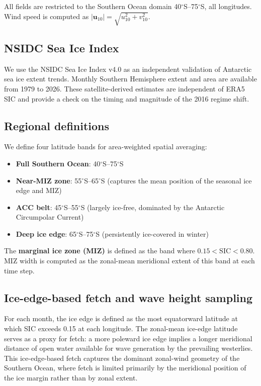 \documentclass[11pt]{article}
\begin{document}
All fields are restricted to the Southern Ocean domain 40$^\circ$S--75$^\circ$S, all longitudes. Wind speed is computed as $|\mathbf{u}_{10}| = \sqrt{u_{10}^2 + v_{10}^2}$.

\subsection{NSIDC Sea Ice Index}

We use the NSIDC Sea Ice Index v4.0\cite{Fetterer2017} as an independent validation of Antarctic sea ice extent trends. Monthly Southern Hemisphere extent and area are available from 1979 to 2026. These satellite-derived estimates are independent of ERA5 SIC and provide a check on the timing and magnitude of the 2016 regime shift.

\subsection{Regional definitions}

We define four latitude bands for area-weighted spatial averaging:
\begin{itemize}
\item \textbf{Full Southern Ocean}: 40$^\circ$S--75$^\circ$S
\item \textbf{Near-MIZ zone}: 55$^\circ$S--65$^\circ$S (captures the mean position of the seasonal ice edge and MIZ)
\item \textbf{ACC belt}: 45$^\circ$S--55$^\circ$S (largely ice-free, dominated by the Antarctic Circumpolar Current)
\item \textbf{Deep ice edge}: 65$^\circ$S--75$^\circ$S (persistently ice-covered in winter)
\end{itemize}

The \textbf{marginal ice zone (MIZ)} is defined as the band where $0.15 < \text{SIC} < 0.80$. MIZ width is computed as the zonal-mean meridional extent of this band at each time step.

\subsection{Ice-edge-based fetch and wave height sampling}

For each month, the ice edge is defined as the most equatorward latitude at which SIC exceeds 0.15 at each longitude. The zonal-mean ice-edge latitude serves as a proxy for fetch: a more poleward ice edge implies a longer meridional distance of open water available for wave generation by the prevailing westerlies. This ice-edge-based fetch captures the dominant zonal-wind geometry of the Southern Ocean, where fetch is limited primarily by the meridional position of the ice margin rather than by zonal extent.
\end{document}
